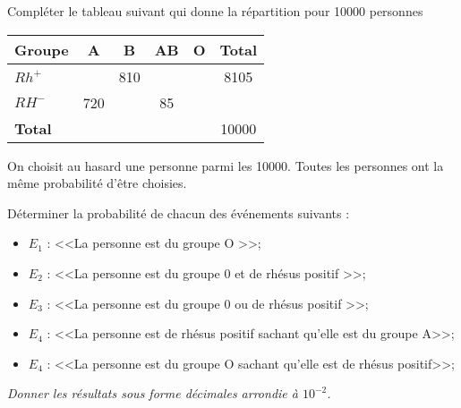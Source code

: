 \begin{questions}
	
\question[5] Compléter le tableau suivant qui donne la répartition pour \num{10000} personnes

\begin{center}
	\begin{tabular}{|@{\ }l@{\ }|c|c|c|c|@{\ }@{\ }c@{\ }@{\ }|}
	\hline
	\textbf{Groupe} & \textbf{A}   & \textbf{B}   & \textbf{AB} & \textbf{O}        & \textbf{Total}       \\ \hline
	\textbf{$Rh^+$} &     & 810 &    &  & \num{8105}  \\ \hline
	\textbf{$RH^-$} & 720 &     & 85 &          &             \\ \hline
	\textbf{Total}  &     &     &    &          & \num{10000} \\ \hline
\end{tabular}

\end{center}


\question[5]

On choisit au hasard une personne parmi les \num{10000}. Toutes les personnes ont la même probabilité d'être choisies.

Déterminer la probabilité de chacun des événements suivants :

\begin{itemize}
	\item $E_1$ : <<La personne est du groupe O >>;
	\item $E_2$ : <<La personne est du groupe 0 et de rhésus positif >>;
	\item $E_3$ : <<La personne est du groupe 0 ou de rhésus positif >>;
	\item $E_4$ : <<La personne est de rhésus positif sachant qu'elle est du groupe A>>;
	\item $E_4$ : <<La personne est du groupe O sachant qu'elle est de rhésus positif>>;
\end{itemize}
\textit{Donner les résultats sous forme décimales arrondie à $10^{-2}$. }


\fillwithdottedlines{9cm}
\end{questions}
